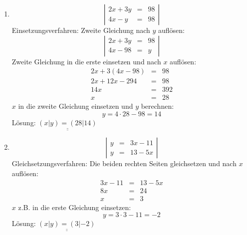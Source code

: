 \documentclass[%
11pt,%
twoside,%
titlepage,%
german,%
]{scrartcl}
\newcommand{\result}[1]{\underline{\underline{#1}}}
\begin{document}
\begin{enumerate}
\begin{enumerate}
  \item 
    \begin{displaymath}
      \left| 
        \begin{array}{rcl}
         2x+3y & = & 98 \\
         4x-y & = & 98
        \end{array} \right|
    \end{displaymath}
    Einsetzungsverfahren: Zweite Gleichung nach $y$ aufl\"osen:
    \begin{displaymath}
      \left| 
        \begin{array}{rcl}
         2x+3y & = & 98 \\
         4x-98 & = & y
        \end{array} \right|
    \end{displaymath}
    Zweite Gleichung in die erste einsetzen und nach $x$ aufl\"osen:
    \begin{eqnarray*}
      2x+3(4x-98) & = & 98 \\
      2x+12x-294 & = & 98 \\
      14x & = & 392 \\
      x & = & 28
    \end{eqnarray*}
    $x$ in die zweite Gleichung einsetzen und $y$ berechnen:
    \begin{displaymath}
      y = 4 \cdot 28 - 98 = 14
    \end{displaymath}
    L\"osung: $\result{(x|y)=(28|14)}$

  \item 
    \begin{displaymath}
      \left| 
        \begin{array}{rcl}
         y & = & 3x-11 \\
         y & = & 13-5x
        \end{array} \right|
    \end{displaymath}
    Gleichsetzungsverfahren: Die beiden rechten Seiten gleichsetzen und nach $x$ aufl\"osen:
    \begin{eqnarray*}
      3x-11 & = & 13-5x \\
      8x & = & 24 \\
      x & = & 3
    \end{eqnarray*}
    $x$ z.B. in die erste Gleichung einsetzen:
    \begin{displaymath}
      y = 3 \cdot 3 -11 = -2
    \end{displaymath}
    L\"osung: $\result{(x|y)=(3|-2)}$


\end{enumerate}
\end{enumerate}
\end{document}
